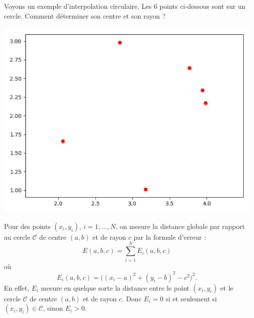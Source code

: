 \documentclass[11pt,class=report,crop=false]{standalone}
\begin{document}
\begin{exemple}
Voyons un exemple d'interpolation circulaire.
Les $6$ points ci-dessous sont sur un cercle. Comment déterminer son centre et son rayon ?
\begin{center}
\includegraphics[scale=\myscale,scale=0.5]{figures/circulaire-01}
\end{center}

Pour des points $(x_i,y_i)$, $i=1,\ldots, N$, on mesure la distance globale par rapport au cercle $\mathcal{C}$ de centre $(a,b)$ et de rayon $c$ par la formule d'erreur :
$$E(a,b,c) = \sum_{i=1}^N E_i(a,b,c)$$
où 
$$E_i(a,b,c) = \big( (x_i-a)^2 + (y_i-b)^2 - c^2 \big)^2.$$
En effet, $E_i$ mesure en quelque sorte la distance entre le point $(x_i,y_i)$ et le cercle $\mathcal{C}$ de centre $(a,b)$ et de rayon $c$. Donc $E_i=0$ si et seulement si $(x_i,y_i) \in \mathcal{C}$, sinon $E_i > 0$.



\end{exemple}
\end{document}
